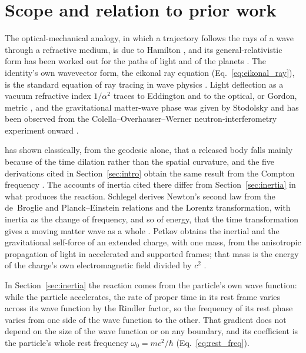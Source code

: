 \documentclass[aps,prd,onecolumn,tightenlines,nofootinbib,notitlepage,11pt,floatfix]{revtex4-2}
\theoremstyle{indentedtheorem}
\begin{document}
\section{Scope and relation to prior work}
\label{sec:scope}

The optical-mechanical analogy, in which a trajectory follows the rays of a wave through a refractive medium, is due to Hamilton \citep{Synge1937Geometrical}, and its general-relativistic form has been worked out for the paths of light and of the planets \citep{Evans1996Optical}. The identity's own wavevector form, the eikonal ray equation (Eq.~\eqref{eq:eikonal_ray}), is the standard equation of ray tracing in wave physics \citep{Whitham1974Linear,Dodin2009Langmuir}. Light deflection as a vacuum refractive index $1/\alpha^2$ traces to Eddington \cite{Eddington1920} and to the optical, or Gordon, metric \citep{Gordon1923Refraction}, and the gravitational matter-wave phase was given by Stodolsky \cite{Stodolsky1979Matter} and has been observed from the Colella--Overhauser--Werner neutron-interferometry experiment onward \citep{Colella1975Observation,Greenberger1979Coherence}.

\citet{Gould2016Why} has shown classically, from the geodesic alone, that a released body falls mainly because of the time dilation rather than the spatial curvature, and the five derivations cited in Section~\ref{sec:intro} obtain the same result from the Compton frequency \citep{Wootters2003Why,Mueller2014Quantum}. The accounts of inertia cited there differ from Section~\ref{sec:inertia} in what produces the reaction. Schlegel derives Newton's second law from the de~Broglie and Planck--Einstein relations and the Lorentz transformation, with inertia as the change of frequency, and so of energy, that the time transformation gives a moving matter wave as a whole \citep{Schlegel1954Wave}. Petkov obtains the inertial and the gravitational self-force of an extended charge, with one mass, from the anisotropic propagation of light in accelerated and supported frames; that mass is the energy of the charge's own electromagnetic field divided by $c^2$ \citep{Petkov1999Acceleration}.

In Section~\ref{sec:inertia} the reaction comes from the particle's own wave function: while the particle accelerates, the rate of proper time in its rest frame varies across its wave function by the Rindler factor, so the frequency of its rest phase varies from one side of the wave function to the other. That gradient does not depend on the size of the wave function or on any boundary, and its coefficient is the particle's whole rest frequency $\omega_0=mc^2/\hbar$ (Eq.~\eqref{eq:rest_freq}).
\end{document}
